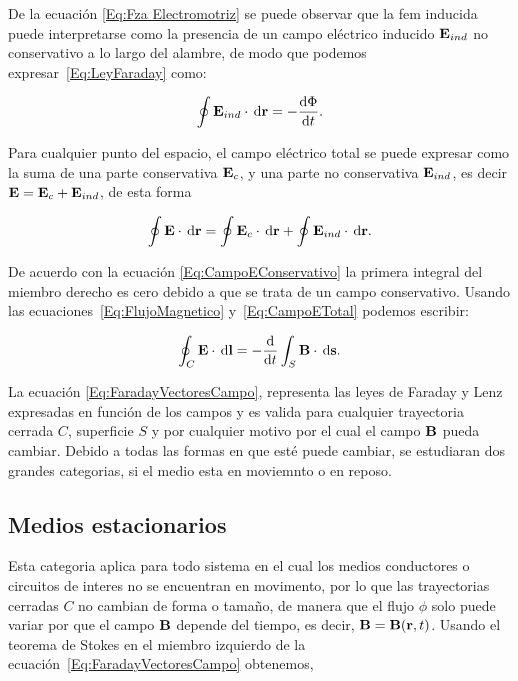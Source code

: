De la ecuación \eqref{Eq:Fza Electromotriz} se puede observar que la fem inducida puede interpretarse como la presencia de un campo eléctrico inducido $\textbf{E}_{ind}$ no conservativo a lo largo del alambre, de modo que podemos expresar~\eqref{Eq:LeyFaraday} como:

\begin{equation}
	\label{Eq:CampoETotal}
	\oint \E_{ind} \cdot \dl{\textbf{r}} = -\diff{\Phi}{t}.
\end{equation}

Para cualquier punto del espacio, el campo eléctrico total se puede expresar como la suma de una parte conservativa $\textbf{E}_c$, y una parte no conservativa $\textbf{E}_{ind}$, es decir $\textbf{E}=\textbf{E}_c+\textbf{E}_{ind}$, de esta forma

\begin{equation*}
	\oint \E \cdot \dl{\textbf{r}} = \oint \E_{c} \cdot \dl{\textbf{r}} + \oint \E_{ind} \cdot \dl{\textbf{r}}.
\end{equation*}

De acuerdo con la ecuación \eqref{Eq:CampoEConservativo} la primera integral del miembro derecho es cero debido a que se trata de un campo conservativo. Usando las ecuaciones~\eqref{Eq:FlujoMagnetico} y~\eqref{Eq:CampoETotal} podemos escribir:

\begin{equation}
	\label{Eq:FaradayVectoresCampo}
	\oint_{C} \E \cdot \dl{\textbf{l}} = -\diff*{ \int_{S} \B \cdot \dl{\textbf{s}} }{t}.
\end{equation}

La ecuación \eqref{Eq:FaradayVectoresCampo}, representa las leyes de Faraday y Lenz expresadas en función de los campos y es valida para cualquier trayectoria cerrada $C$, superficie $S$ y por cualquier motivo por el cual el campo $\textbf{B}$ pueda cambiar. Debido a todas las formas en que est\'e puede cambiar, se estudiaran dos grandes categorias, si el medio esta en moviemnto o en reposo.

\subsection{Medios estacionarios}

Esta categoria aplica para todo sistema en el cual los medios conductores o circuitos de interes no se encuentran en movimento, por lo que las trayectorias cerradas $C$ no cambian de forma o tamaño, de manera que el flujo $\phi$ solo puede variar por que el campo $\textbf{B}$ depende del tiempo, es decir, $\textbf{B} = \textbf{B}(\textbf{r}, t)$. Usando el teorema de Stokes en el miembro izquierdo de la ecuación~\eqref{Eq:FaradayVectoresCampo} obtenemos,

